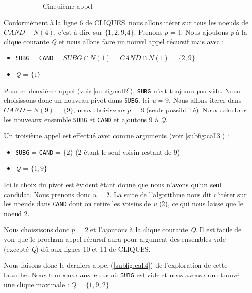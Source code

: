 \documentclass[12pt,a4paper]{article}
\begin{document}
\begin{figure}
\begin{subfigure}[b]{0.33\textwidth}
      \caption{Cinquième appel}
      \label{subfig:call5}
    \end{subfigure}
      \caption{}
      \label{fig:ex1}
\end{figure}

Conformément à la ligne 6 de CLIQUES, nous allons itérer sur tous les noeuds de \(CAND - N(4)\), c'est-à-dire sur \(\{1, 2, 9, 4\}\).
Prenons \emph{p} = 1.
Nous ajoutons \emph{p} à la clique courante \emph{Q} et nous allons faire un nouvel appel récursif mais avec :
\begin{itemize}
  \item \texttt{SUBG} = \texttt{CAND} = \(SUBG \cap N(1) = CAND \cap N(1) = \{2, 9\}\)
  \item \emph{Q} = \(\{1\}\)
\end{itemize}

Pour ce deuxième appel (voir \ref{subfig:call2}), \texttt{SUBG} n'est toujours pas vide. Nous choisissons donc un nouveau pivot dans \texttt{SUBG}. Ici \emph{u} = 9. Nous allons itérer dans \(CAND - N(9) = \{9\}\), nous choisissons \emph{p} = 9 (seule possibilité). Nous calculons les nouveaux ensemble \texttt{SUBG} et \texttt{CAND} et ajoutons 9 à \emph{Q}.

Un troisième appel est effectué avec comme arguments (voir \ref{subfig:call3}) :
\begin{itemize}
  \item \texttt{SUBG} = \texttt{CAND} = \(\{2\}\) (2 étant le seul voisin restant de 9)
  \item \emph{Q} = \(\{1, 9\}\)
\end{itemize}

Ici le choix du pivot est évident étant donné que nous n'avons qu'un seul candidat. Nous prenons donc \emph{u} = 2. La suite de l'algorithme nous dit d'itérer sur les noeuds dans \texttt{CAND} dont on retire les voisins de \emph{u} (2), ce qui nous laisse que le noeud 2.

Nous choissisons donc \emph{p} = 2 et l'ajoutons à la clique courante \emph{Q}.
Il est facile de voir que le prochain appel récursif aura pour argument des ensembles vide (excepté \emph{Q}) dû aux lignes 10 et 11 de CLIQUES.

Nous faisons donc le derniers appel (\ref{subfig:call4}) de l'exploration de cette branche. Nous tombons dans le cas où \texttt{SUBG} est vide et nous avons donc trouvé une clique maximale : \(Q = \{1, 9, 2\}\)
\end{document}
